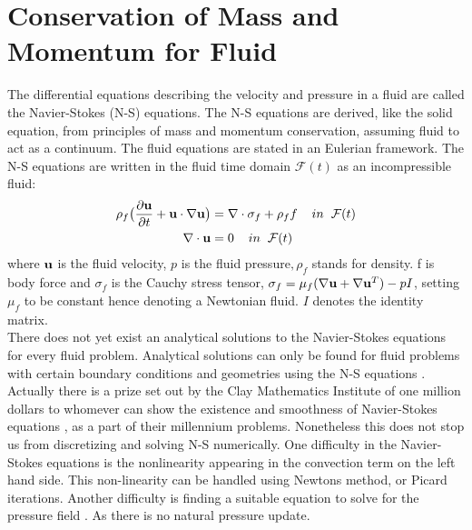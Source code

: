 \section{Conservation of Mass and Momentum for Fluid}
The differential equations describing the velocity and pressure in a fluid are called the Navier-Stokes (N-S) equations. The N-S equations are derived, like the solid equation, from principles of mass and momentum conservation, assuming fluid to act as a continuum.
The fluid equations are stated in an Eulerian framework. 
The N-S equations are written in the fluid time domain $\mathcal{F}(t)$ as an incompressible fluid:
\begin{align}
\label{eq:NS}
\rho_f\big( \frac{\partial \bold{u}}{\partial t} +  \bold{u} \cdot \nabla \bold{u}\big) &= \nabla \cdot \sigma_f + \rho_ff  \hspace{4mm} in \hspace{2mm} \mathcal{F}(t)\\
\nabla \cdot \bold{u} &= 0 \hspace{4mm} in \hspace{2mm} \mathcal{F}(t)
\end{align}
where $\bold{u}$ is the fluid velocity, $p$ is the fluid pressure$, \rho_f$ stands for density. f is body force and $\sigma_f$ is the Cauchy stress tensor, $ \sigma_f = \mu_f (\nabla \bold{u} + \nabla \bold{u}^T)  - pI$, setting $\mu_f$ to be constant hence denoting a Newtonian fluid. $I$ denotes the identity matrix. \\

There does not yet exist an analytical solutions to the Navier-Stokes equations for every fluid problem. 
Analytical solutions can only be found for fluid problems with certain boundary conditions and geometries using the N-S equations \cite{White2000}. Actually there is a prize set out by the Clay Mathematics Institute of one million dollars to whomever can show the existence and smoothness of Navier-Stokes equations \cite{Fefferman2000}, as a part of their millennium problems. 
Nonetheless this does not stop us from discretizing and solving N-S numerically. One difficulty in the Navier-Stokes equations is the nonlinearity appearing in the convection term on the left hand side. This non-linearity can be handled using Newtons method, or Picard iterations. Another difficulty is finding a suitable equation to solve for the pressure field \cite{Charlesworth2003}. As there is no natural pressure update. 